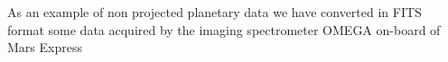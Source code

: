 As an example of non projected planetary data we have converted in FITS format some data
acquired by the imaging spectrometer OMEGA on-board of Mars Express